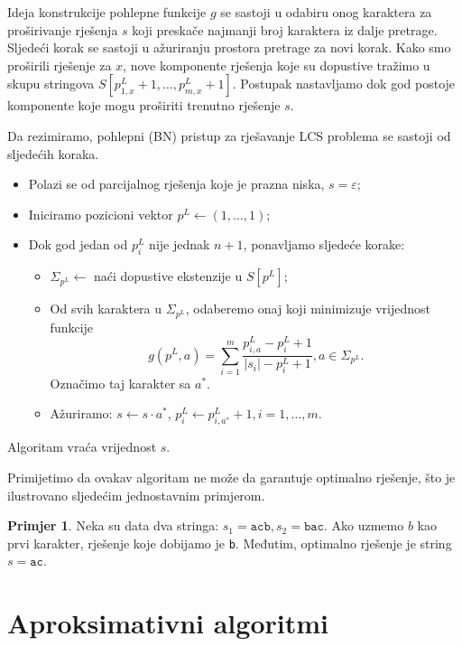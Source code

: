 \documentclass[a4paper, utf8, 11pt, colorlinks]{book}
\theoremstyle{definition}
\newtheorem{primjer}{Primjer}[chapter]
\begin{document}
 Ideja konstrukcije pohlepne funkcije $g$ se sastoji u odabiru onog karaktera za proširivanje rješenja $s$ koji preskače najmanji broj karaktera iz dalje pretrage. Sljedeći korak se sastoji u ažuriranju prostora pretrage za novi korak. Kako smo proširili rješenje za $x$, nove komponente rješenja koje su dopustive tražimo u skupu stringova $S[p^L_{1,x}+1,\ldots, p^L_{m, x}+1]$. Postupak nastavljamo dok god postoje komponente koje mogu proširiti trenutno rješenje $s$. 


 Da rezimiramo, pohlepni (BN) pristup za rješavanje LCS problema se sastoji od sljedećih koraka.
\begin{itemize}
	\item Polazi se od parcijalnog rješenja koje je prazna niska, $s=\varepsilon$;
	\item Iniciramo pozicioni vektor $p^L \gets (1,\ldots, 1) $;
	\item Dok god jedan od $p^L_i$ nije jednak $n+1$, ponavljamo sljedeće korake: 
	\begin{itemize}
   	     \item $\Sigma_{p^L} \gets$ naći dopustive ekstenzije u $S[p^L]$;
	      \item Od svih karaktera u $\Sigma_{p^L}$, odaberemo onaj koji minimizuje vrijednost funkcije 
	      $$g( p^L,a) = \sum_{i=1}^m\frac{p^L_{i,a} - p^L_i + 1 }{|s_i| - p^L_i + 1 }, a \in \Sigma_{ p^L }.$$
	      Označimo taj karakter sa $a^*$. 
	      \item Ažuriramo: $s \gets  s \cdot a^*$, $p^L_i \gets p^L_{i, a^*} +1, i = 1,\ldots,m.$
    \end{itemize}
\end{itemize}
Algoritam vraća vrijednost $s$. 

Primijetimo da ovakav algoritam ne može da garantuje optimalno rješenje, što je ilustrovano sljedećim jednostavnim primjerom. 

\begin{primjer} Neka su data dva stringa: $s_1 = \texttt{acb}, s_2 = \texttt{bac}$. Ako uzmemo  $ b$ kao prvi karakter, rješenje koje dobijamo je \texttt{b}. Međutim, optimalno rješenje je string $s=\texttt{ac}$. 
	\end{primjer}

\section{Aproksimativni algoritmi} 
  
\end{document}
